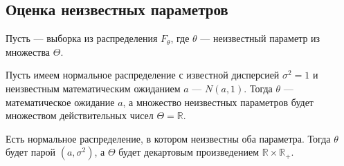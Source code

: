 \begin{comment}
Представим, что значение функции --- это высота прямоугольника,
а длина отрезка --- его ширина (графически это изображается именно так).
Тогда отношение количества элементов, попавших в полуинтервал,
к количеству всех элементов выборки (вероятность того, что случайно взятый
элемент из выборки попадёт в $k$-ый отрезок \cite[стр.~24]{BorovkovMS}),
является площадью прямоугольника. Воспользовавшись формулой
\eqref{eq:histogram_borovkov}, получаем равенство
$$S_k
  = q_n^k \cdot \left| I_k \right|
  = \frac{\nu_k\left(X\right)}{n}= \probabilityn{x\in I_k}$$

Если устремить количество полуинтервалов к бесконечности ($m\to\infty$),
то каждый полуинтервал будет сжиматься в точку.
При этом вероятность попадания $x$ в отрезок будет стремиться
к вероятности попадания $x$ в точку $y$.
Введём обозначения $|I_j|= \delta$, $I_j= \Delta_y$
$$\probabilityn{x=y}
\approx\probabilityn{x\in\Delta_y}=q_n\left(y\right)\cdot \delta,
\qquad m\to\infty$$

Очень напоминает ситуацию с плотностью распределения
непрерывной случайной величины $\xi$
$$\probability{\xi=x}\approx\pdf{x}\cdot \delta,\qquad\delta\to 0$$

Нужно отметить, что количество элементов выборки
должно стремиться к бесконечности ($n\to\infty$),
так как плотность может быть лишь у непрерывных случайных величин.
Чем больше будет элементов,
тем плотнее они будут стоять на числовой прямой.
\end{comment}
\subsection{Оценка неизвестных параметров}
Пусть \xsample --- выборка из распределения $F_\theta$,
где $\theta$ --- неизвестный параметр из множества $\Theta$.

\begin{example}
  Пусть имеем нормальное распределение с известной дисперсией $\sigma^2 = 1$
  и неизвестным математическим ожиданием $a$ --- $N\left(a,1\right)$.
  Тогда $\theta$ --- математическое ожидание $a$, а множество неизвестных
  параметров будет множеством действительных чисел $\Theta = \mathbb{R}$.
\end{example}
\begin{example}
  Есть нормальное распределение, в котором неизвестны оба параметра.
  Тогда $\theta$ будет парой $\left( a,\sigma^2 \right)$,
  а $\Theta$ будет декартовым произведением $\mathbb{R} \times \mathbb{R_+}$.
\end{example}

